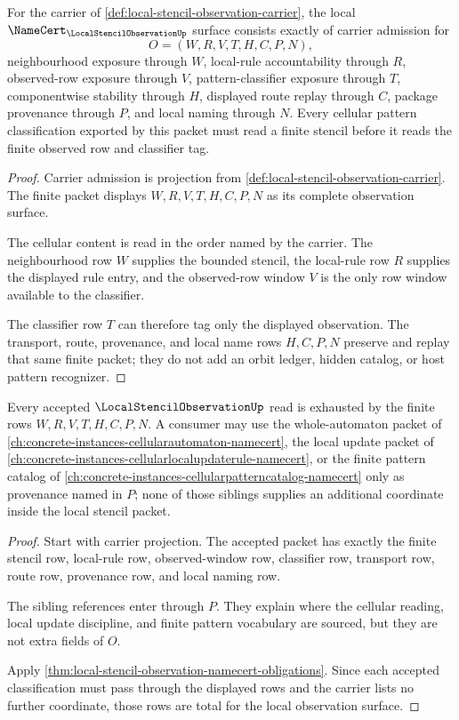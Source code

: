 \begin{theorem}
\label{thm:local-stencil-observation-namecert-obligations}
For the carrier of \autoref{def:local-stencil-observation-carrier}, the local $\NameCert_{\LocalStencilObservationUp}$ surface consists exactly of carrier admission for
$$
O=(W,R,V,T,H,C,P,N),
$$
neighbourhood exposure through $W$, local-rule accountability through $R$, observed-row exposure through $V$, pattern-classifier exposure through $T$, componentwise stability through $H$, displayed route replay through $C$, package provenance through $P$, and local naming through $N$. Every cellular pattern classification exported by this packet must read a finite stencil before it reads the finite observed row and classifier tag.
\end{theorem}
\begin{proof}
Carrier admission is projection from \autoref{def:local-stencil-observation-carrier}. The finite packet displays $W,R,V,T,H,C,P,N$ as its complete observation surface.

The cellular content is read in the order named by the carrier. The neighbourhood row $W$ supplies the bounded stencil, the local-rule row $R$ supplies the displayed rule entry, and the observed-row window $V$ is the only row window available to the classifier.

The classifier row $T$ can therefore tag only the displayed observation. The transport, route, provenance, and local name rows $H,C,P,N$ preserve and replay that same finite packet; they do not add an orbit ledger, hidden catalog, or host pattern recognizer.
\end{proof}

\begin{theorem}
\label{thm:local-stencil-observation-carrier-totality}
Every accepted $\LocalStencilObservationUp$ read is exhausted by the finite rows $W,R,V,T,H,C,P,N$. A consumer may use the whole-automaton packet of \autoref{ch:concrete-instances-cellularautomaton-namecert}, the local update packet of \autoref{ch:concrete-instances-cellularlocalupdaterule-namecert}, or the finite pattern catalog of \autoref{ch:concrete-instances-cellularpatterncatalog-namecert} only as provenance named in $P$; none of those siblings supplies an additional coordinate inside the local stencil packet.
\end{theorem}
\begin{proof}
Start with carrier projection. The accepted packet has exactly the finite stencil row, local-rule row, observed-window row, classifier row, transport row, route row, provenance row, and local naming row.

The sibling references enter through $P$. They explain where the cellular reading, local update discipline, and finite pattern vocabulary are sourced, but they are not extra fields of $O$.

Apply \autoref{thm:local-stencil-observation-namecert-obligations}. Since each accepted classification must pass through the displayed rows and the carrier lists no further coordinate, those rows are total for the local observation surface.
\end{proof}

